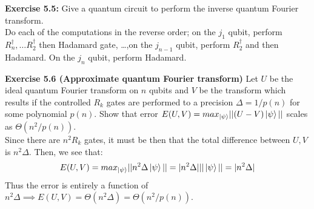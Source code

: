 \documentclass{article}
\begin{document}
\begin{tcolorbox}\textbf{Exercise 5.5:} Give a quantum circuit to perform the inverse quantum Fourier transform.\\
Do each of the computations in the reverse order; on the $j_1$ qubit, perform $R^\dag_n, \dots R^\dag_2$ then Hadamard gate, \dots,on the $j_{n-1}$ qubit, perform $R^\dag_2$ and then Hadamard. On the $j_n$ qubit, perform Hadamard.
\end{tcolorbox}
\begin{tcolorbox}\textbf{Exercise 5.6 (Approximate quantum Fourier transform)} Let $U$ be the ideal quantum Fourier transform on $n$ qubits and $V$ be the transform which results if the controlled $R_k$ gates are performed to a precision $\Delta = 1/p(n)$ for some polynomial $p(n)$. Show that error $E(U,V) = max_{\ket{\psi}} ||(U-V)\ket{\psi}||$ scales as $\Theta(n^2/p(n))$.\\
	Since there are $n^2 R_k$ gates, it must be then that the total difference between $U,V$ is $n^2 \Delta$. Then, we see that:
	$$E(U,V) = max_{\ket{\psi}} ||n^2\Delta \ket{\psi}|| = |n^2 \Delta| ||\ket{\psi}|| = |n^2 \Delta|$$
	Thus the error is entirely a function of $n^2 \Delta \implies E(U,V) = \Theta(n^2 \Delta) = \Theta(n^2/p(n))$.
\end{tcolorbox}
\end{document}
